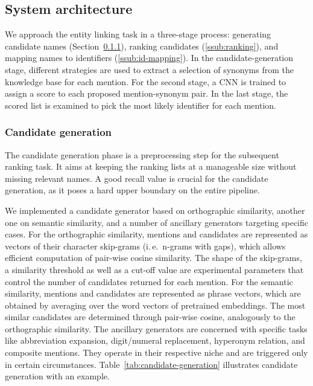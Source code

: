 \documentclass{bioinfo}
\newcommand{\ie}{i.\,e.\ }
\begin{document}


\subsection{System architecture}

We approach the entity linking task in a three-stage process:
generating candidate names (Section~\ref{ssub:cand-gen}),
ranking candidates (\ref{ssub:ranking}), and
mapping names to identifiers (\ref{ssub:id-mapping}).
In the candidate-generation stage, different strategies are used to extract a selection of synonyms from the knowledge base for each mention.
For the second stage, a CNN is trained to assign a score to each proposed mention-synonym pair.
In the last stage, the scored list is examined to pick the most likely identifier for each mention.

\subsubsection{Candidate generation}
\label{ssub:cand-gen}

The candidate generation phase is a preprocessing step for the subsequent ranking task.
It aims at keeping the ranking lists at a manageable size without missing relevant names.
A good recall value is crucial for the candidate generation, as it poses a hard upper boundary on the entire pipeline.

We implemented a candidate generator based on orthographic similarity, another one on semantic similarity, and a number of ancillary generators targeting specific cases.
For the orthographic similarity, mentions and candidates are represented as vectors of their character skip-grams (\ie n-grams with gaps),  %
which allows efficient computation of pair-wise cosine similarity.
The shape of the skip-grams, a similarity threshold as well as a cut-off value are experimental parameters that control the number of candidates returned for each mention.
For the semantic similarity, mentions and candidates are represented as phrase vectors, which are obtained by averaging over the word vectors of pretrained embeddings.
The most similar candidates are determined through pair-wise cosine, analogously to the orthographic similarity.
The ancillary generators are concerned with specific tasks like abbreviation expansion, digit/numeral replacement, hyperonym relation, and composite mentions.
They operate in their respective niche and are triggered only in certain circumstances.
Table~\ref{tab:candidate-generation} illustrates candidate generation with an example.
\end{document}
